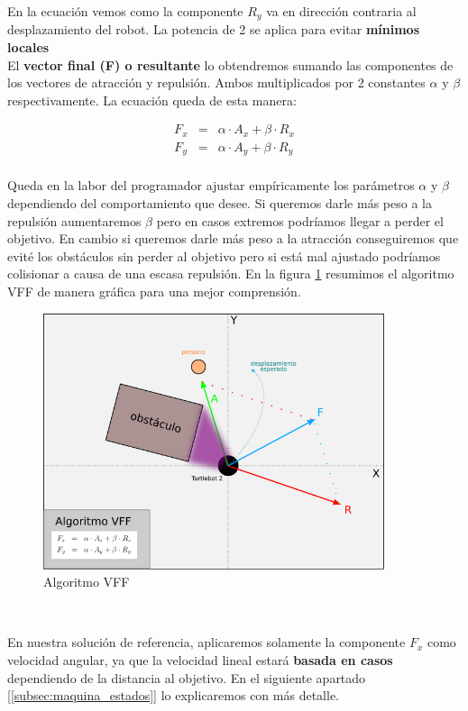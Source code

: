 En la ecuación vemos como la componente $R_y$ va en dirección contraria al desplazamiento del robot. La potencia de 2 se aplica para evitar \textbf{mínimos locales}\\

El \textbf{vector final (F) o resultante} lo obtendremos sumando las componentes de los vectores de atracción y repulsión. Ambos multiplicados por 2 constantes $\alpha$ y $\beta$ respectivamente. La ecuación queda de esta manera:

\begin{eqnarray*}
F_x &=& \alpha \cdot A_x + \beta \cdot R_x\\
F_y &=& \alpha \cdot A_y + \beta \cdot R_y\\
\end{eqnarray*}

Queda en la labor del programador ajustar empíricamente los parámetros $\alpha$ y $\beta$ dependiendo del comportamiento que desee. Si queremos darle más peso a la repulsión aumentaremos $\beta$ pero en casos extremos podríamos llegar a perder el objetivo. En cambio si queremos darle más peso a la atracción conseguiremos que evité los obstáculos sin perder al objetivo pero si está mal ajustado podríamos colisionar a causa de una escasa repulsión. En la figura \ref{fig:esquema_vff} resumimos el algoritmo VFF de manera gráfica para una mejor comprensión.\\

\begin{figure} [H]
  \begin{center}
    \includegraphics[width=10cm]{imagenes/esquema-vff.png}
  \end{center}
  \caption[Algoritmo VFF]{Algoritmo VFF}
  \label{fig:esquema_vff}
\end{figure}\

En nuestra solución de referencia, aplicaremos solamente la componente $F_x$ como velocidad angular, ya que la velocidad lineal estará \textbf{basada en casos} dependiendo de la distancia al objetivo. En el siguiente apartado [\ref{subsec:maquina_estados}] lo explicaremos con más detalle.\\



